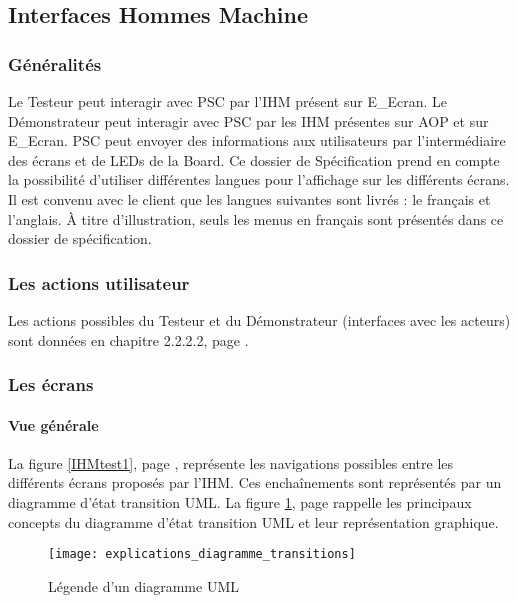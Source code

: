 \subsection{Interfaces Hommes Machine}

\subsubsection{Généralités}

Le Testeur peut interagir avec PSC par l'IHM présent sur E\_Ecran.
Le Démonstrateur peut interagir avec PSC par les IHM présentes sur AOP et sur E\_Ecran.
PSC peut envoyer des informations aux utilisateurs par l’intermédiaire des écrans et de LEDs de la Board.
Ce dossier de Spécification prend en compte la possibilité d'utiliser différentes langues pour l'affichage sur les différents écrans. 
Il est convenu avec le client que les langues suivantes sont livrés : le français et l'anglais.
À titre d'illustration, seuls les menus en français sont présentés dans ce dossier de spécification.

\subsubsection{Les actions utilisateur}

Les actions possibles du Testeur et du Démonstrateur (interfaces avec les acteurs) sont données en chapitre 2.2.2.2, page \pageref{ContexteLogique}.

\subsubsection{Les écrans}

\paragraph{Vue générale}

La figure \ref{IHMtest1}, page \pageref{IHMtest1}, représente les navigations possibles entre les différents écrans proposés par l’IHM. 
Ces enchaînements sont représentés par un diagramme d'état transition UML. 
La figure \ref{IHMtest}, page \pageref{IHMtest} rappelle les principaux concepts du diagramme d'état transition UML et leur représentation graphique. \\

\begin{figure} [H]
    \centering
    \texttt{[image: explications\_diagramme\_transitions]}
    \caption{Légende d'un diagramme UML}
    \label{IHMtest}
\end{figure}

